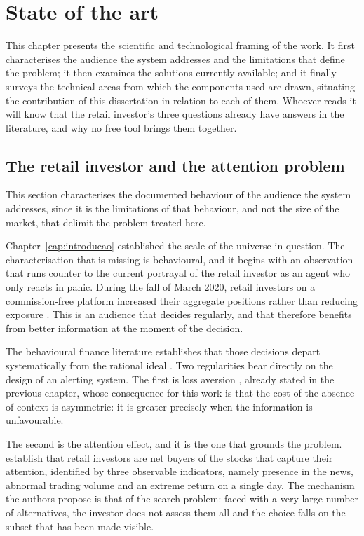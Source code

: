 \chapter{State of the art}
\label{cap:contexto}

This chapter presents the scientific and technological framing of the work. It first characterises
the audience the system addresses and the limitations that define the problem; it then examines the
solutions currently available; and it finally surveys the technical areas from which the components
used are drawn, situating the contribution of this dissertation in relation to each of them. Whoever reads it will know that the retail investor's three questions already have answers in the literature, and why no free tool brings them together.

\section{The retail investor and the attention problem}
\label{sec:ctx_investidor}

This section characterises the documented behaviour of the audience the system addresses, since it
is the limitations of that behaviour, and not the size of the market, that delimit the problem
treated here.

Chapter~\ref{cap:introducao} established the scale of the universe in question. The
characterisation that is missing is behavioural, and it begins with an observation that runs
counter to the current portrayal of the retail investor as an agent who only reacts in panic.
During the fall of March 2020, retail investors on a commission-free platform increased their
aggregate positions rather than reducing exposure \autocite{welch2022robinhood}. This is an
audience that decides regularly, and that therefore benefits from better information at the moment
of the decision.

The behavioural finance literature establishes that those decisions depart systematically from the
rational ideal \autocite{barberis2003behavioral}. Two regularities bear directly on the design of
an alerting system. The first is loss aversion \autocite{kahneman1979prospect}, already stated in
the previous chapter, whose consequence for this work is that the cost of the absence of context is
asymmetric: it is greater precisely when the information is unfavourable.

The second is the attention effect, and it is the one that grounds the problem.
\textcite{barber2008glitters} establish that retail investors are net buyers of the stocks that
capture their attention, identified by three observable indicators, namely presence in the news,
abnormal trading volume and an extreme return on a single day. The mechanism the authors propose is
that of the search problem: faced with a very large number of alternatives, the investor does not
assess them all and the choice falls on the subset that has been made visible.

